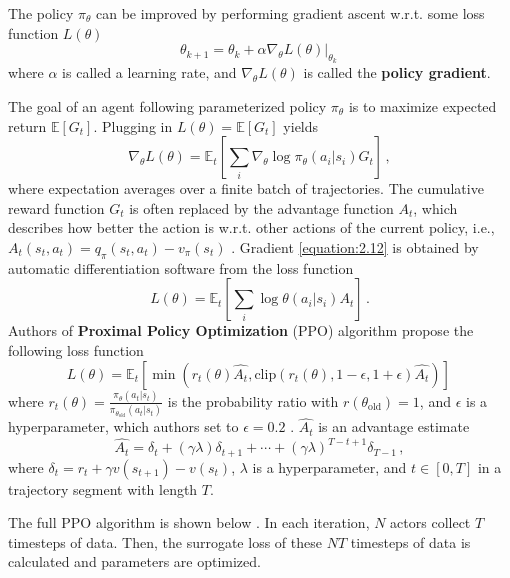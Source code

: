 The policy $\pi_\theta$ can be improved by performing gradient ascent w.r.t. some loss function $L(\theta)$ \cite{openai_policy_optimization}
\begin{equation}
	\theta_{k+1} = \theta_k + \alpha \nabla_\theta L(\theta)|_{\theta_k} \,
\end{equation}
where $\alpha$ is called a learning rate, and $\nabla_\theta L(\theta)$ is called the \textbf{policy gradient}. 
\par
The goal of an agent following parameterized policy $\pi_\theta$ is to maximize expected return $\mathbb{E} \left [ G_t \right ]$. Plugging in $L(\theta) = \mathbb{E} \left [ G_t \right ]$ yields \cite{openai_policy_optimization,DBLP:journals/corr/SchulmanWDRK17}
\begin{equation} \label{equation:2.12}
	\nabla_\theta L(\theta) = \mathbb{E}_t \left [ \sum_i \nabla_\theta \log \pi_\theta(a_i|s_i) G_t \right ] \, ,
\end{equation}
where expectation averages over a finite batch of trajectories. The cumulative reward function $G_t$ is often replaced by the advantage function $A_t$, which describes how better the action is w.r.t. other actions of the current policy, i.e., $A_t(s_t,a_t) = q_\pi(s_t, a_t) - v_\pi(s_t)$ \cite{openai_policy_optimization}. Gradient \ref{equation:2.12} is obtained by automatic differentiation software from the loss function \cite{DBLP:journals/corr/SchulmanWDRK17}
\begin{equation}
	L(\theta) = \mathbb{E}_t \left [ \sum_i \log \theta(a_i|s_i) A_t \right ] \, .
\end{equation}
Authors of \textbf{Proximal Policy Optimization} (PPO) algorithm \cite{DBLP:journals/corr/SchulmanWDRK17} propose the following loss function
\begin{equation}
	L(\theta) = \mathbb{E}_t \left [ \min \left( r_t(\theta) \hat{A_t} , \text{clip}(r_t(\theta), 1-\epsilon, 1+\epsilon) \hat{A_t} \right) \right ] \,
\end{equation}
where $r_t(\theta) = \frac{\pi_\theta(a_t|s_t)}{\pi_{\theta_\text{old}}(a_t|s_t)}$ is the probability ratio with $r(\theta_\text{old}) = 1$, and $\epsilon$ is a hyperparameter, which authors set to $\epsilon = 0.2$ \cite{DBLP:journals/corr/SchulmanWDRK17}. $\hat{A_t}$ is an advantage estimate \cite{DBLP:journals/corr/SchulmanWDRK17}
\begin{equation}
	\hat{A_t} = \delta_t + (\gamma \lambda) \delta_{t+1} + \cdots + (\gamma\lambda)^{T - t + 1} \delta_{T - 1} \, ,
\end{equation}
where $\delta_t = r_t + \gamma v(s_{t+1}) - v(s_t)$, $\lambda$ is a hyperparameter, and $t \in \left [ 0, T \right ]$ in a trajectory segment with length $T$.
\par
The full PPO algorithm is shown below \cite{DBLP:journals/corr/SchulmanWDRK17}. In each iteration, $N$ actors collect $T$ timesteps of data. Then, the surrogate loss of these $NT$ timesteps of data is calculated and parameters are optimized.

